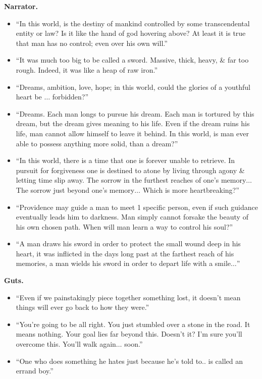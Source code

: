 \documentclass{article}
\begin{document}
\begin{enumerate}
    {\bf Narrator.}
   	\begin{itemize}
   		\item ``In this world, is the destiny of mankind controlled by some transcendental entity or law? Is it like the hand of god hovering above? At least it is true that man has no control; even over his own will.''
   		\item ``It was much too big to be called a sword. Massive, thick, heavy, \& far too rough. Indeed, it was like a heap of raw iron.''
   		\item ``Dreams, ambition, love, hope; in this world, could the glories of a youthful heart be $\ldots$ forbidden?''
   		\item ``Dreams. Each man longs to pursue his dream. Each man is tortured by this dream, but the dream gives meaning to his life. Even if the dream ruins his life, man cannot allow himself to leave it behind. In this world, is man ever able to possess anything more solid, than a dream?''
   		\item ``In this world, there is a time that one is forever unable to retrieve. In pursuit for forgiveness one is destined to atone by living through agony \& letting time slip away. The sorrow in the furthest reaches of one's memory$\ldots$ The sorrow just beyond one's memory$\ldots$ Which is more heartbreaking?''
   		\item ``Providence may guide a man to meet 1 specific person, even if such guidance eventually leads him to darkness. Man simply cannot forsake the beauty of his own chosen path. When will man learn a way to control his soul?''
   		\item ``A man draws his sword in order to protect the small wound deep in his heart, it was inflicted in the days long past at the farthest reach of his memories, a man wields his sword in order to depart life with a smile$\ldots$''
   	\end{itemize}
    {\bf Guts.}
    \begin{itemize}
    	\item ``Even if we painstakingly piece together something lost, it doesn't mean things will ever go back to how they were.''
    	\item ``You're going to be all right. You just stumbled over a stone in the road. It means nothing. Your goal lies far beyond this. Doesn't it? I'm sure you'll overcome this. You'll walk again$\ldots$ soon.''
    	\item ``One who does something he hates just because he's told to.. is called an errand boy.''

\end{itemize}
\end{enumerate}
\end{document}
